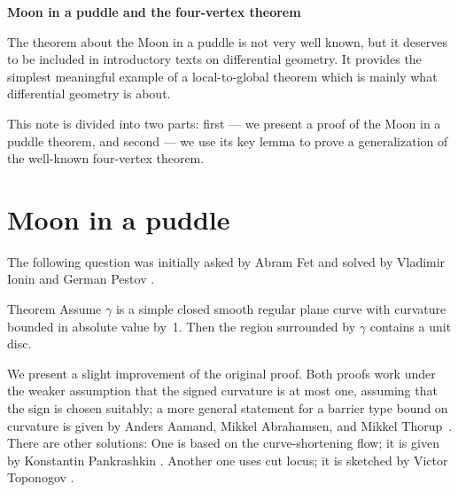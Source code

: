 \documentclass{article}
\begin{document}

\BgThispage
\thispagestyle{empty}
\begin{center}
\Huge{\bf Moon in a puddle and the four-vertex theorem}
\end{center}


\title{%
}
\author{%
}

\thispagestyle{empty}

\newpage

The theorem about the Moon in a puddle is not very well known, but it deserves to be included in introductory texts on differential geometry.
It provides the simplest meaningful example of a local-to-global theorem which is mainly what differential geometry is about.

This note is divided into two parts:  first --- we present a proof of the Moon in a puddle theorem, and second --- we use its key lemma to prove a generalization of the well-known four-vertex theorem.


\section*{Moon in a puddle}

The following question was initially asked by Abram Fet and solved by Vladimir Ionin and German Pestov \cite{pestov-ionin}.

\begin{thm}{Theorem}\label{thm:moon-orginal}
Assume $\gamma$ is a simple closed smooth regular plane curve with curvature bounded in absolute value by~1.
Then the region surrounded by $\gamma$ contains a unit disc.
\end{thm}

We present %
a slight improvement of the original proof.
Both proofs work under the weaker assumption that the signed curvature is at most one, assuming that the sign is chosen suitably;
a more general statement for a barrier type bound on curvature is given by Anders Aamand, Mikkel Abrahamsen, and Mikkel Thorup~\cite{aamand-abrahamsen-thoru}.
There are other solutions: 
One is based on the curve-shortening flow; it is given by Konstantin Pankrashkin  \cite{pankrashkin}.
Another one uses cut locus; it is sketched by Victor Toponogov %
\cite[Problem 1.7.19]{toponogov}.
\end{document}
